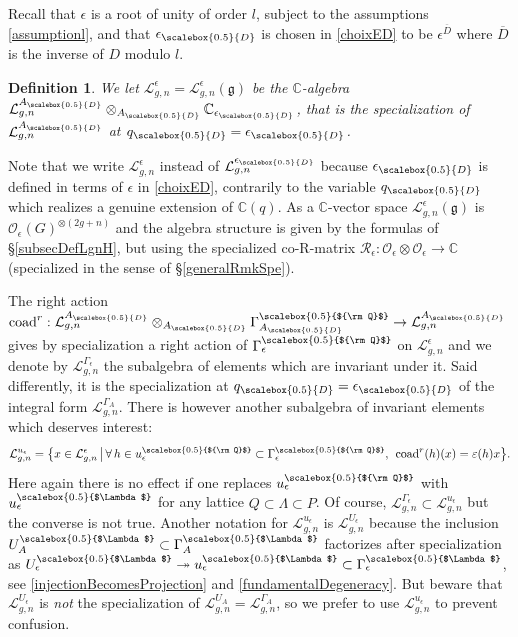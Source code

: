 \documentclass[11pt]{amsart}
\newtheorem{defi}[teo]{Definition}
\newcommand{\e}{\epsilon}
\newcommand{\Oo}{\mathcal{O}}
\newcommand{\qD}{q_{\scalebox{0.5}{D}}}
\newcommand{\eD}{\epsilon_{\scalebox{0.5}{D}}}
\newcommand{\AD}{A_{\scalebox{0.5}{D}}}
\newcommand{\Q}{{\scalebox{0.5}{${\rm Q}$}}}
\newcommand{\Lam}{{\scalebox{0.5}{$\Lambda$}}}
\begin{document}
\smallskip

\indent Recall that $\epsilon$ is a root of unity of order $l$, subject to the assumptions \eqref{assumptionl}, and that $\eD$ is chosen in \eqref{choixED} to be $\e^{\overline{D}}$ where $\overline{D}$ is the inverse of $D$ modulo $l$.

\begin{defi}\label{DefLgnesept25}
We let $\mathcal{L}_{g,n}^{\e} = \mathcal{L}_{g,n}^{\e}(\mathfrak{g})$ be the $\mathbb{C}$-algebra $\mathcal{L}_{g,n}^{\AD} \otimes_{\AD} \mathbb{C}_{\eD}$, that is the specialization of $\mathcal{L}_{g,n}^{\AD}$ at $\qD = \eD$.
\end{defi}

\noindent Note that we write $\mathcal{L}_{g,n}^{\e}$ instead of $\mathcal{L}_{g,n}^{\eD}$ because $\eD$ is defined in terms of $\e$ in \eqref{choixED}, contrarily to the variable $\qD$ which realizes a genuine extension of $\mathbb{C}(q)$. As a $\mathbb{C}$-vector space $\mathcal{L}_{g,n}^{\e}(\mathfrak{g})$ is $\Oo_\e(G)^{\otimes (2g+n)}$ and the algebra structure is given by the formulas of \S\ref{subsecDefLgnH}, but using the specialized co-R-matrix $\mathcal{R}_{\e} : \Oo_\e \otimes \Oo_\e \to \mathbb{C}$ (specialized in the sense of \S\ref{generalRmkSpe}).

\indent The right action $\mathrm{coad}^r : \mathcal{L}_{g,n}^{\AD} \otimes_{\AD} \Gamma_{\AD}^\Q \to \mathcal{L}_{g,n}^{\AD}$ gives by specialization a right action of $\Gamma^\Q_\e$ on  $\mathcal{L}_{g,n}^\e$ and we denote by $\mathcal{L}_{g,n}^{\Gamma_\e}$ the subalgebra of elements which are invariant under it. Said differently, it is the specialization at $\qD = \eD$ of the integral form $\mathcal{L}_{g,n}^{\Gamma_A}$. There is however another subalgebra of invariant elements which deserves interest:
\begin{equation}\label{defSmallInvEps}
\mathcal{L}_{g,n}^{u_\e} = \bigl\{ x \in \mathcal{L}_{g,n}^\e \, \big|\, \forall \, h \in u_\e^\Q \subset \Gamma_\e^\Q, \:\: \mathrm{coad}^r(h)(x) = \varepsilon(h)x \bigr\}.
\end{equation}
Here again there is no effect if one replaces $u_\e^\Q$ with $u_\e^\Lam$ for any lattice $Q \subset \Lambda \subset P$. Of course, $\mathcal{L}_{g,n}^{\Gamma_\e} \subset \mathcal{L}_{g,n}^{u_\e}$ but the converse is not true. Another notation for $\mathcal{L}_{g,n}^{u_\e}$ is $\mathcal{L}_{g,n}^{U_\e}$ because the inclusion $U_A^\Lam \subset \Gamma_A^\Lam$ factorizes after specialization as $U_\e^\Lam \twoheadrightarrow u_\e^\Lam \subset \Gamma_\e^\Lam$, see \eqref{injectionBecomesProjection} and \eqref{fundamentalDegeneracy}. But beware that $\mathcal{L}_{g,n}^{U_\e}$ is {\em not} the specialization of $\mathcal{L}_{g,n}^{U_A} = \mathcal{L}_{g,n}^{\Gamma_A}$, so we prefer to use $\mathcal{L}_{g,n}^{u_\e}$ to prevent confusion.
\end{document}

